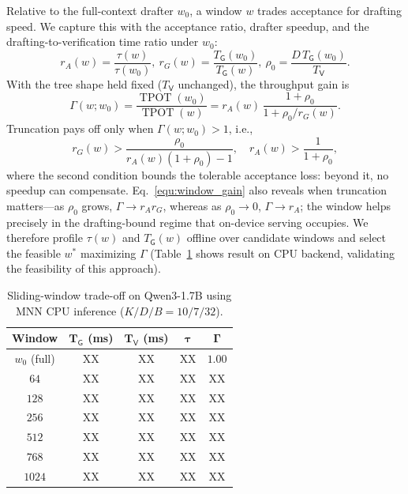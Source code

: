 \documentclass[sigconf,nonacm,10pt]{acmart}
\begin{document}
Relative to the full-context drafter $w_0$, a window $w$ trades acceptance for drafting speed. We capture this with the acceptance ratio, drafter speedup, and the drafting-to-verification time ratio under $w_0$:
\begin{equation}
 r_A(w)=\frac{\tau(w)}{\tau(w_0)},
 \ 
 r_G(w)=\frac{T_{\mathsf G}(w_0)}{T_{\mathsf G}(w)},
 \ 
 \rho_0=\frac{D\,T_{\mathsf G}(w_0)}{T_{\mathsf V}}.
\label{equ:window_ratios}
\end{equation}
With the tree shape held fixed ($T_{\mathsf V}$ unchanged), the throughput gain is
\begin{equation}
\Gamma(w;w_0)=\frac{\operatorname{TPOT}(w_0)}{\operatorname{TPOT}(w)}
 =r_A(w)\,\frac{1+\rho_0}{1+\rho_0/r_G(w)}.
\label{equ:window_gain}
\end{equation}
Truncation pays off only when $\Gamma(w;w_0)>1$, i.e.,
\begin{equation}
r_G(w)>\frac{\rho_0}{r_A(w)(1+\rho_0)-1},
\quad
r_A(w)>\frac{1}{1+\rho_0},
\label{equ:window_break_even}
\end{equation}
where the second condition bounds the tolerable acceptance loss: beyond it, no speedup can compensate. Eq.~\eqref{equ:window_gain} also reveals when truncation matters---as $\rho_0$ grows, $\Gamma \to r_A r_G$, whereas as $\rho_0 \to 0$, $\Gamma \to r_A$; the window helps precisely in the drafting-bound regime that on-device serving occupies. We therefore profile $\tau(w)$ and $T_{\mathsf G}(w)$ offline over candidate windows and select the feasible $w^*$ maximizing $\Gamma$ (Table~\ref{tab:window_tradeoff} shows result on CPU backend, validating the feasibility of this approach).

\begin{table}[t]
\caption{{Sliding-window trade-off on Qwen3-1.7B using MNN CPU inference ($K/D/B=10/7/32$).}}
\label{tab:window_tradeoff}
\centering
\setlength{\tabcolsep}{5pt}
\begin{tabular}{ccccc}
\toprule
\textbf{Window} & $\boldsymbol{T_\mathsf G}$ (ms) & $\boldsymbol{T_\mathsf V}$ (ms) &
$\boldsymbol{\tau}$ & $\boldsymbol{\Gamma}$ \\
\midrule
$w_0$ (full) & {\color{red}XX} & {\color{red}XX} & {\color{red}XX} & $1.00$ \\
$64$         & {\color{red}XX} & {\color{red}XX} & {\color{red}XX} & {\color{red}XX} \\
$128$        & {\color{red}XX} & {\color{red}XX} & {\color{red}XX} & {\color{red}XX} \\
$256$        & {\color{red}XX} & {\color{red}XX} & {\color{red}XX} & {\color{red}XX} \\
$512$        & {\color{red}XX} & {\color{red}XX} & {\color{red}XX} & {\color{red}XX} \\
$768$        & {\color{red}XX} & {\color{red}XX} & {\color{red}XX} & {\color{red}XX} \\
$1024$       & {\color{red}XX} & {\color{red}XX} & {\color{red}XX} & {\color{red}XX} \\
\bottomrule
\end{tabular}
\end{table}
\end{document}
